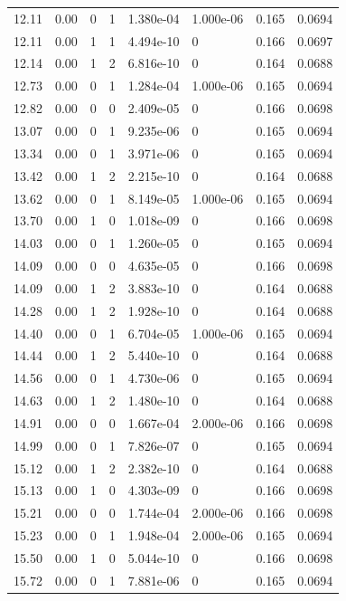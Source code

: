 \documentclass[preview]{standalone}
\begin{document}
{{{\begin{tabular}{L{1.2cm}C{1.2cm} C{0.3cm}C{0.5cm} C{1.4cm}C{1.4cm} C{1.4cm}C{1.4cm}}
  12.11  &  0.00  & 0     &  1 &  1.380e-04  & 1.000e-06  & 0.165 &  0.0694   \\ 
  12.11  &  0.00  & 1     &  1 &  4.494e-10  & 0  & 0.166 &  0.0697   \\ 
  12.14  &  0.00  & 1     &  2 &  6.816e-10  & 0  & 0.164 &  0.0688   \\ 
  12.73  &  0.00  & 0     &  1 &  1.284e-04  & 1.000e-06  & 0.165 &  0.0694   \\ 
  12.82  &  0.00  & 0     &  0 &  2.409e-05  & 0  & 0.166 &  0.0698   \\ 
  13.07  &  0.00  & 0     &  1 &  9.235e-06  & 0  & 0.165 &  0.0694   \\ 
  13.34  &  0.00  & 0     &  1 &  3.971e-06  & 0  & 0.165 &  0.0694   \\ 
  13.42  &  0.00  & 1     &  2 &  2.215e-10  & 0  & 0.164 &  0.0688   \\ 
  13.62  &  0.00  & 0     &  1 &  8.149e-05  & 1.000e-06  & 0.165 &  0.0694   \\ 
  13.70  &  0.00  & 1     &  0 &  1.018e-09  & 0  & 0.166 &  0.0698   \\ 
  14.03  &  0.00  & 0     &  1 &  1.260e-05  & 0  & 0.165 &  0.0694   \\ 
  14.09  &  0.00  & 0     &  0 &  4.635e-05  & 0  & 0.166 &  0.0698   \\ 
  14.09  &  0.00  & 1     &  2 &  3.883e-10  & 0  & 0.164 &  0.0688   \\ 
  14.28  &  0.00  & 1     &  2 &  1.928e-10  & 0  & 0.164 &  0.0688   \\ 
  14.40  &  0.00  & 0     &  1 &  6.704e-05  & 1.000e-06  & 0.165 &  0.0694   \\ 
  14.44  &  0.00  & 1     &  2 &  5.440e-10  & 0  & 0.164 &  0.0688   \\ 
  14.56  &  0.00  & 0     &  1 &  4.730e-06  & 0  & 0.165 &  0.0694   \\ 
  14.63  &  0.00  & 1     &  2 &  1.480e-10  & 0  & 0.164 &  0.0688   \\ 
  14.91  &  0.00  & 0     &  0 &  1.667e-04  & 2.000e-06  & 0.166 &  0.0698   \\ 
  14.99  &  0.00  & 0     &  1 &  7.826e-07  & 0  & 0.165 &  0.0694   \\ 
  15.12  &  0.00  & 1     &  2 &  2.382e-10  & 0  & 0.164 &  0.0688   \\ 
  15.13  &  0.00  & 1     &  0 &  4.303e-09  & 0  & 0.166 &  0.0698   \\ 
  15.21  &  0.00  & 0     &  0 &  1.744e-04  & 2.000e-06  & 0.166 &  0.0698   \\ 
  15.23  &  0.00  & 0     &  1 &  1.948e-04  & 2.000e-06  & 0.165 &  0.0694   \\ 
  15.50  &  0.00  & 1     &  0 &  5.044e-10  & 0  & 0.166 &  0.0698   \\ 
  15.72  &  0.00  & 0     &  1 &  7.881e-06  & 0  & 0.165 &  0.0694   \\ 
\hline 
\end{tabular} 

}}}
\end{document}
